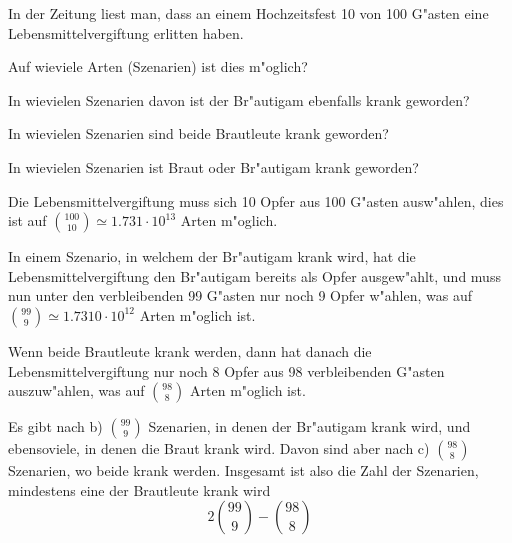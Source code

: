 In der Zeitung liest man, dass an einem Hochzeitsfest 10
von 100 G"asten eine Lebensmittelvergiftung erlitten haben.
\begin{teilaufgaben}
\item
Auf wieviele Arten (Szenarien) ist dies m"oglich?
\item
In wievielen Szenarien
davon ist der Br"autigam ebenfalls krank geworden?
\item In wievielen Szenarien sind beide Brautleute krank
geworden?
\item In wievielen Szenarien ist Braut oder Br"autigam
krank geworden?
\end{teilaufgaben}

\begin{loesung}
\begin{teilaufgaben}
\item Die Lebensmittelvergiftung muss sich 10 Opfer aus 100 G"asten
ausw"ahlen, dies ist auf $ \binom{100}{10}\simeq 1.731\cdot10^{13}$
Arten m"oglich.
\item
In einem Szenario, in welchem der Br"autigam krank wird, hat die
Lebensmittelvergiftung den Br"autigam bereits als Opfer ausgew"ahlt,
und muss nun unter den verbleibenden 99 G"asten nur noch 9 Opfer
w"ahlen, was auf $\binom{99}{9}\simeq1.7310\cdot10^{12}$ Arten
m"oglich ist.
\item
Wenn beide Brautleute krank werden, dann hat danach die Lebensmittelvergiftung
nur noch 8 Opfer aus 98 verbleibenden G"asten auszuw"ahlen, was auf
$\binom{98}{8}$ Arten m"oglich ist.
\item
Es gibt nach b) $\binom{99}{9}$ Szenarien, in denen der Br"autigam
krank wird, und ebensoviele, in denen die Braut krank wird. Davon
sind aber nach c) $\binom{98}{8}$ Szenarien, wo beide krank werden.
Insgesamt ist also die Zahl der Szenarien, mindestens eine der Brautleute
krank wird
\[
2\binom{99}{9}-\binom{98}{8}
\]
\end{teilaufgaben}
\end{loesung}

